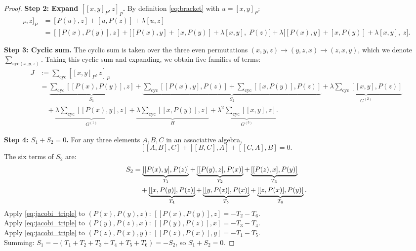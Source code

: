 \documentclass[10pt,a4paper]{amsart}
\begin{document}
\begin{proof}
\textbf{Step 2: Expand $[[x,y]_P,z]_P$.}
By definition \eqref{eq:bracket} with $u=[x,y]_P$:
\begin{align*}
[[x,y]_P,z]_P
  &= [P(u),z] + [u,P(z)] + \lambda[u,z] \\
  &= [[P(x),P(y)],z]
     + \bigl[[P(x),y]+[x,P(y)]+\lambda[x,y],\; P(z)\bigr]
     + \lambda\bigl[[P(x),y]+[x,P(y)]+\lambda[x,y],\; z\bigr].
\end{align*}

\textbf{Step 3: Cyclic sum.}
The cyclic sum is taken over the three even permutations
$(x,y,z) \to (y,z,x) \to (z,x,y)$, which we denote $\sum_{\mathrm{cyc}(x,y,z)}$.
Taking this cyclic sum and expanding, we obtain five families of terms:
\begin{align*}
J &:= \sum_{\mathrm{cyc}}[[x,y]_P,z]_P \\
  &= \underbrace{\sum_{\mathrm{cyc}}[[P(x),P(y)],z]}_{S_1}
   + \underbrace{\sum_{\mathrm{cyc}}[[P(x),y],P(z)]
                +\sum_{\mathrm{cyc}}[[x,P(y)],P(z)]}_{S_2}
   + \underbrace{\lambda\sum_{\mathrm{cyc}}[[x,y],P(z)]}_{G^{(2)}}\\
  &\quad + \underbrace{\lambda\sum_{\mathrm{cyc}}[[P(x),y],z]}_{G^{(1)}}
   + \underbrace{\lambda\sum_{\mathrm{cyc}}[[x,P(y)],z]}_{H}
   + \underbrace{\lambda^2\sum_{\mathrm{cyc}}[[x,y],z]}_{G^{(3)}}.
\end{align*}

\textbf{Step 4: $S_1 + S_2 = 0$.}
For any three elements $A,B,C$ in an associative algebra,
\begin{equation}\label{eq:jacobi_triple}
[[A,B],C] + [[B,C],A] + [[C,A],B] = 0.
\end{equation}
The six terms of $S_2$ are:
\begin{align}\label{eq:group2}
S_2 &= \underbrace{[[P(x),y],P(z)]}_{T_1}
      + \underbrace{[[P(y),z],P(x)]}_{T_2}
      + \underbrace{[[P(z),x],P(y)]}_{T_3} \notag\\
    &\quad + \underbrace{[[x,P(y)],P(z)]}_{T_4}
      + \underbrace{[[y,P(z)],P(x)]}_{T_5}
      + \underbrace{[[z,P(x)],P(y)]}_{T_6}.
\end{align}
Apply \eqref{eq:jacobi_triple} to $(P(x),P(y),z)$:
$[[P(x),P(y)],z] = -T_2-T_6$.\\
Apply \eqref{eq:jacobi_triple} to $(P(y),P(z),x)$:
$[[P(y),P(z)],x] = -T_3-T_4$.\\
Apply \eqref{eq:jacobi_triple} to $(P(z),P(x),y)$:
$[[P(z),P(x)],y] = -T_1-T_5$.\\
Summing: $S_1 = -(T_1+T_2+T_3+T_4+T_5+T_6) = -S_2$, so $S_1+S_2 = 0$.


\end{proof}
\end{document}
